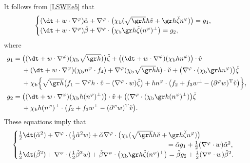 It follows from \eqref{LSWEe5} that
\[
\begin{cases}
(\dt + w\cdot\nabla^\varphi)\check{\alpha} + \nabla^\varphi\cdot\bigl(\chi_\mathrm{b}(\sqrt{\gr h}h\check{v} + \gr h \check{\zeta}n^\varphi)\bigr) = g_1, \\
(\dt+w\cdot\nabla^\varphi)\check{\beta}
+ \nabla^\varphi\cdot\bigl(\chi_\mathrm{b}\gr h\check{\zeta}(n^\varphi)^\perp\bigr) = g_2,
\end{cases}
\]
where
\begin{align*}
g_1
&= \bigl((\dt+w\cdot\nabla^\varphi)(\chi_\mathrm{b}\sqrt{\gr h})\bigr)\check{\zeta} + \bigl((\dt+w\cdot\nabla^\varphi)(\chi_\mathrm{b}h n^\varphi)\bigr)\cdot\check{v} \\
&\quad\;
+ (\dt+w\cdot\nabla^\varphi)(\chi_\mathrm{b}n^\varphi\cdot f_4)
+ \nabla^\varphi(\chi_\mathrm{b}\sqrt{\gr h}h)\cdot\check{v} + \bigl(\nabla^\varphi\cdot(\chi_\mathrm{b}\gr h n^\varphi)\bigr)\check{\zeta} \\
&\quad\;
+ \chi_\mathrm{b}\Bigl\{ \sqrt{\gr h}\bigl(f_1-\nabla^\varphi h\cdot\check{v}-(\nabla^\varphi\cdot w)\check{\zeta}\bigr)
+ h n^\varphi\cdot\bigl(f_2 + f_3w^\perp-(\partial^\varphi w)^\mathrm{T}\check{v}\bigr)\Bigr\}, \\
g_2
&= \bigl((\dt+w\cdot\nabla^\varphi)(\chi_\mathrm{b}h(n^\varphi)^\perp)\bigr)\cdot\check{v} + \bigl((\nabla^\varphi\cdot(\chi_\mathrm{b}\gr h(n^\varphi)^\perp)\bigr)\check{\zeta} \\
&\quad\;
+ \chi_\mathrm{b}h(n^\varphi)^\perp\cdot\bigl(f_2 + f_3w^\perp-(\partial^\varphi w)^\mathrm{T}\check{v}\bigr).
\end{align*}
These equations imply that
\begin{equation}\label{EqCF1}
\begin{cases}
\frac12\dt(\check{\alpha}^2) + \nabla^\varphi\cdot(\frac12\check{\alpha}^2w)
+ \check{\alpha}\nabla^\varphi\cdot\bigl(\chi_\mathrm{b}(\sqrt{\gr h}h\check{v} + \gr h\check{\zeta}n^\varphi)\bigr)\\
\hphantom{\frac12\dt(\check{\beta}^2) + \nabla^\varphi\cdot(\frac12\check{\beta}^2w)
+ \check{\beta}\nabla^\varphi\cdot(\chi_\mathrm{b}\gr h\check{\zeta}(n^\varphi)^\perp)}= \check{\alpha}g_1 + \frac12(\nabla^\varphi\cdot w)\check{\alpha}^2, \\
\frac12\dt(\check{\beta}^2) + \nabla^\varphi\cdot(\frac12\check{\beta}^2w)
+ \check{\beta}\nabla^\varphi\cdot\bigl(\chi_\mathrm{b}\gr h\check{\zeta}(n^\varphi)^\perp\bigr)
= \check{\beta}g_2 + \frac12(\nabla^\varphi\cdot w)\check{\beta}^2.
\end{cases}
\end{equation}
